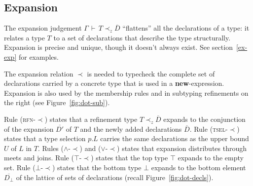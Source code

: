 \documentclass[9pt]{sigplanconf}
\newcommand{\figref}[1]
        {Figure~\ref{fig:#1}}
\newcommand{\ts}{\,\vdash\,}
\newcommand{\expand}{\prec}
\newcommand{\tand}{\wedge}
\newcommand{\tor}{\vee}
\newcommand{\seq}[1]{\overline{#1}}
\newcommand{\Bot}{\bot}%
\begin{document}
\subsection{Expansion}

The expansion judgement $\Gamma \ts T \expand_z {\seq {D}}$
``flattens'' all the declarations of a type: it relates a type $T$ to
a set of declarations that describe the type structurally. Expansion
is precise and unique, though it doesn't always exist. See
section~\ref{ex-exp} for examples.
      
The expansion relation $\expand$ is needed to typecheck the complete
set of declarations carried by a concrete type that is used in a
\textbf{new}-expression. Expansion is also used by the membership
rules and in subtyping refinements on the right (see
\figref{dot-sub}).

Rule (\textsc{rfn-$\expand$}) states that a refinement type $T
\expand_z {\seq D}$ expands to the conjunction of the expansion $\seq {D'}$
of $T$ and the newly added declarations $\seq D$. Rule
(\textsc{tsel-$\expand$}) states that a type selection $p.L$ carries
the same declarations as the upper bound $U$ of $L$ in $T$.  Rules
($\tand$-$\expand$) and ($\tor$-$\expand$) states that expansion
distributes through meets and joins.  Rule (\textsc{$\top$-$\expand$})
states that the top type $\top$ expands to the empty set. Rule
(\textsc{$\bot$-$\expand$}) states that the bottom type $\bot$ expands
to the bottom element $\seq{D_\Bot}$ of the lattice of sets of
declarations (recall \figref{dot-decls}).
\end{document}
